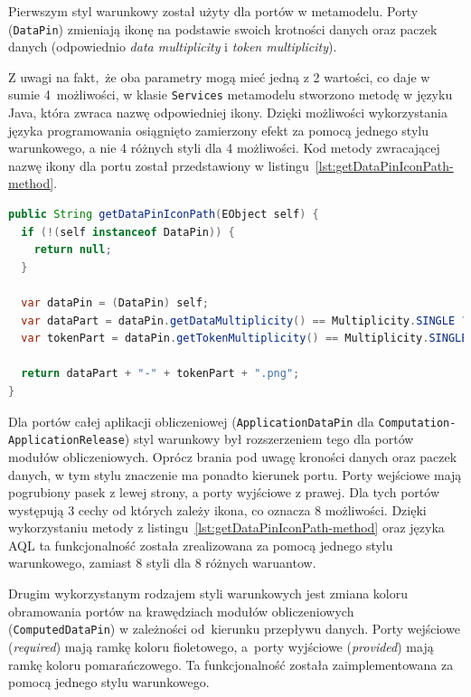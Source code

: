 Pierwszym styl warunkowy został użyty dla portów w metamodelu. Porty
(\texttt{DataPin}) zmieniają ikonę na podstawie swoich krotności danych oraz
paczek danych (odpowiednio \emph{data multiplicity} i \emph{token
	multiplicity}).

Z uwagi na fakt, że oba parametry mogą mieć jedną z 2 wartości,
co daje w sumie 4~możliwości, w klasie \texttt{Services} metamodelu stworzono
metodę w języku Java, która zwraca nazwę odpowiedniej ikony.
Dzięki możliwości wykorzystania języka programowania osiągnięto
zamierzony efekt za pomocą jednego stylu warunkowego, a nie 4 różnych
styli dla 4 możliwości. Kod metody zwracającej nazwę ikony dla portu
został przedstawiony w listingu~\ref{lst:getDataPinIconPath-method}.

\begin{lstlisting}[language=Java,
    caption={Methoda zwracająca nazwę ikony dla portu.},
    label={lst:getDataPinIconPath-method}]
public String getDataPinIconPath(EObject self) {
  if (!(self instanceof DataPin)) {
    return null;
  }

  var dataPin = (DataPin) self;
  var dataPart = dataPin.getDataMultiplicity() == Multiplicity.SINGLE ? "single-data" : "multiple-data";
  var tokenPart = dataPin.getTokenMultiplicity() == Multiplicity.SINGLE ? "single-token" : "multiple-tokens";

  return dataPart + "-" + tokenPart + ".png";
}
\end{lstlisting}

Dla portów całej aplikacji obliczeniowej (\texttt{ApplicationDataPin} dla
\texttt{Computation-\linebreak ApplicationRelease}) styl warunkowy był
rozszerzeniem tego
dla portów modułów obliczeniowych. Oprócz brania pod uwagę kroności danych oraz
paczek danych, w tym stylu znaczenie ma ponadto kierunek portu. Porty wejściowe
mają pogrubiony pasek z lewej strony, a porty wyjściowe z prawej. Dla tych
portów występują 3 cechy od których zależy ikona, co oznacza 8 możliwości.
Dzięki wykorzystaniu metody z listingu~\ref{lst:getDataPinIconPath-method} oraz
języka \gls{AQL} ta funkcjonalność została zrealizowana za pomocą jednego stylu
warunkowego, zamiast 8 styli dla 8 różnych waruantow.

Drugim wykorzystanym rodzajem styli warunkowych jest zmiana koloru obramowania
portów na krawędziach modułów obliczeniowych (\texttt{ComputedDataPin}) w
zależności od~kierunku przepływu danych. Porty wejściowe (\emph{required}) mają
ramkę koloru fioletowego, a~porty wyjściowe (\emph{provided}) mają ramkę koloru
pomarańczowego. Ta funkcjonalność została zaimplementowana za pomocą jednego
stylu warunkowego.

